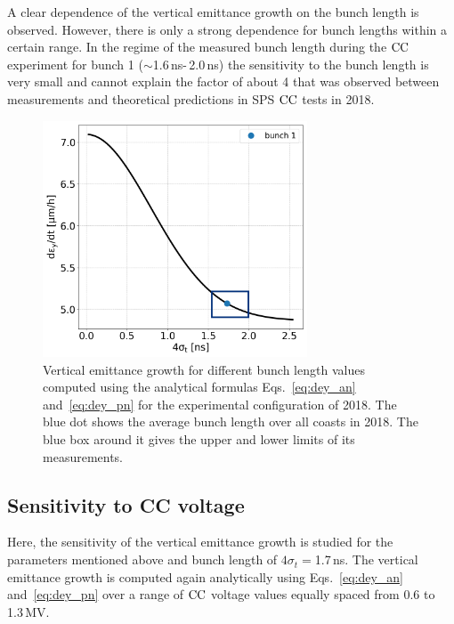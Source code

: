 A clear dependence of the vertical emittance growth on the bunch length is observed. However, there is only a strong dependence for bunch lengths within a certain range. In the regime of the measured bunch length during the ${\mathrm{CC}}$ experiment for bunch 1 ($\sim$1.6\,ns-\,2.0\,ns) the sensitivity to the bunch length is very small and cannot explain the factor of about 4 that was observed between measurements and theoretical predictions in SPS ${\mathrm{CC}}$ tests in 2018.

\begin{figure}[!h]
    \centering         
    \includegraphics[width=0.7\textwidth]{images/Ch6/dey_vs_4sigmat_Coast2-Setting2_withBunches_v2.png}
        \caption{Vertical emittance growth for different bunch length values computed using the analytical formulas Eqs.~\eqref{eq:dey_an} and~\eqref{eq:dey_pn} for the experimental configuration of 2018. The blue dot shows the average bunch length over all coasts in 2018. The blue box around it gives the upper and lower limits of its measurements.}
        \label{fig:sensitivity_bunch_length_theory_bunch1}
 \end{figure}


\subsection{Sensitivity to CC voltage}\label{subsec:bunch_length_dependence}
Here, the sensitivity of the vertical emittance growth is studied for the parameters mentioned above and bunch length of $4\sigma_t=$1.7\,ns. The vertical emittance growth is computed again analytically using Eqs.~\eqref{eq:dey_an} and~\eqref{eq:dey_pn} over a range of ${\mathrm{CC}}$ voltage values equally spaced from 0.6 to 1.3\,MV. 

